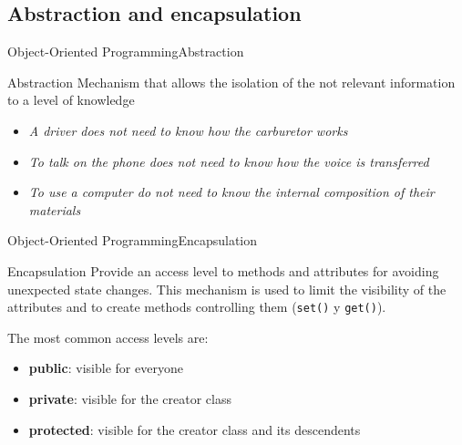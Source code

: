 \documentclass[10pt,compress]{beamer} %
\begin{document}
\subsection{Abstraction and encapsulation}

\begin{frame}{Object-Oriented Programming}{Abstraction}
	\begin{block}{Abstraction}
		Mechanism that allows the isolation of the not relevant information to a level of knowledge
  	\end{block}	
	
	\begin{itemize}
		\item \textit{A driver does not need to know how the carburetor works} 
		\item \textit{To talk on the phone does not need to know how the voice is transferred} 
		\item \textit{To use a computer do not need to know the internal composition of their materials}
		
	\end{itemize}
\end{frame}

\begin{frame}{Object-Oriented Programming}{Encapsulation}
	\begin{block}{Encapsulation}
		Provide an access level to methods and attributes for avoiding unexpected state changes. This mechanism is used to limit the visibility of the attributes and to create methods controlling them (\texttt{set()} y \texttt{get()}).
  	\end{block}	
	
	The most common access levels are:
	
	\begin{itemize}
		\item \textbf{public}: visible for everyone
		\item \textbf{private}: visible for the creator class
		\item \textbf{protected}: visible for the creator class and its descendents
	\end{itemize}
\end{frame}

\end{document}
